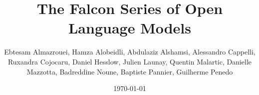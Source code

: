 \documentclass{beamer}
\title{The Falcon Series of Open Language Models}
\author{Ebtesam Almazrouei, Hamza Alobeidli, Abdulaziz Alshamsi, Alessandro Cappelli, Ruxandra Cojocaru, Daniel Hesslow, Julien Launay, Quentin Malartic, Danielle Mazzotta, Badreddine Noune, Baptiste Pannier, Guilherme Penedo}
\date{\today}
\begin{document}
\begin{frame}
\titlepage
\end{frame}
\end{document}

